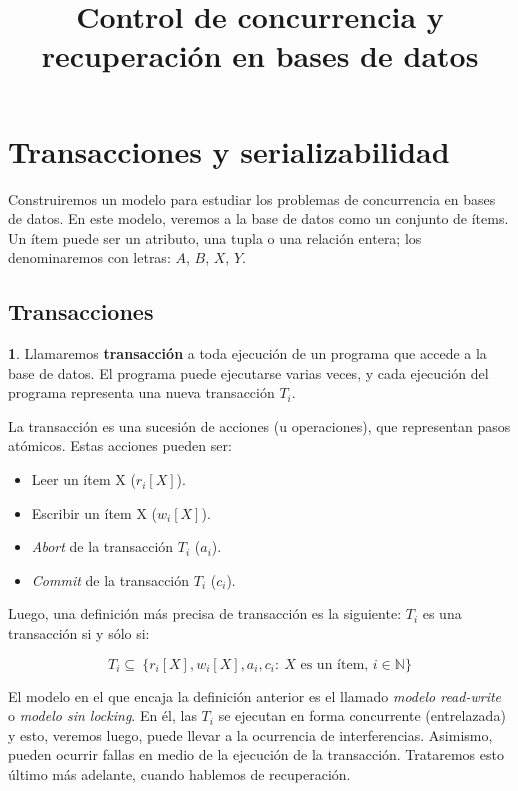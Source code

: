 \documentclass[english]{article}
\theoremstyle{definition}
\theoremstyle{definition}
\newtheorem*{defn*}{\protect\definitionname}
\providecommand{\definitionname}{Definición}
\begin{document}
\title{Control de concurrencia y recuperación en bases de datos}


\section{Transacciones y serializabilidad}

Construiremos un modelo para estudiar los problemas de concurrencia en bases
de datos. En este modelo, veremos a la base de datos como un conjunto de
ítems. Un ítem puede ser un atributo, una tupla o una relación entera; los
denominaremos con letras: $A$, $B$, $X$, $Y$.

\subsection{Transacciones}

\begin{defn*}
Llamaremos \textbf{transacción} a toda ejecución de un programa que accede a
la base de datos. El programa puede ejecutarse varias veces, y cada ejecución
del programa representa una nueva transacción $T_i$.

La transacción es una sucesión de acciones (u operaciones), que representan
pasos atómicos. Estas acciones pueden ser:

\begin{itemize}
    \item Leer un ítem X ($r_i[X]$).
    \item Escribir un ítem X ($w_i[X]$).
    \item \emph{Abort} de la transacción $T_i$ ($a_i$).
    \item \emph{Commit} de la transacción $T_i$ ($c_i$).
\end{itemize}

Luego, una definición más precisa de transacción es la siguiente: $T_i$ es una
transacción si y sólo si:

$$T_i \subseteq \
    \{r_i[X], w_i[X], a_i, c_i: \
        X \mbox{ es un ítem, } i \in \mathbb{N}\}$$
\end{defn*}

El modelo en el que encaja la definición anterior es el llamado \emph{modelo
read-write} o \emph{modelo sin locking}. En él, las $T_i$ se ejecutan en forma
concurrente (entrelazada) y esto, veremos luego, puede llevar a la ocurrencia
de interferencias. Asimismo, pueden ocurrir fallas en medio de la ejecución de
la transacción. Trataremos esto último más adelante, cuando hablemos de
recuperación.
\end{document}
